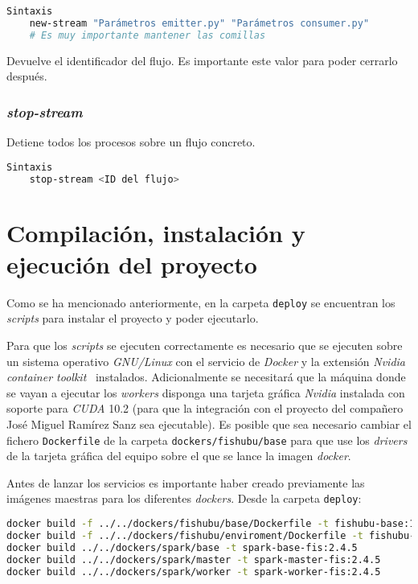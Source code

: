 \begin{lstlisting}[language=Bash]
Sintaxis
	new-stream "Parámetros emitter.py" "Parámetros consumer.py"
	# Es muy importante mantener las comillas
\end{lstlisting}

Devuelve el identificador del flujo. Es importante este valor para poder cerrarlo después.

\subsubsection{\textit{stop-stream}}
Detiene todos los procesos sobre un flujo concreto.

\begin{lstlisting}[language=Bash]
Sintaxis
	stop-stream <ID del flujo>
\end{lstlisting}

\section{Compilación, instalación y ejecución del proyecto}

Como se ha mencionado anteriormente, en la carpeta \texttt{deploy} se encuentran los \textit{scripts} para instalar el proyecto y poder ejecutarlo.

Para que los \textit{scripts} se ejecuten correctamente es necesario que se ejecuten sobre un sistema operativo \textit{GNU/Linux} con el servicio de \textit{Docker} y la extensión \textit{Nvidia container toolkit}~\cite{toolkitnvidiadocker} instalados. Adicionalmente se necesitará que la máquina donde se vayan a ejecutar los \textit{workers} disponga una tarjeta gráfica \textit{Nvidia} instalada con soporte para \textit{CUDA} 10.2 (para que la integración con el proyecto del compañero José Miguel Ramírez Sanz sea ejecutable). Es posible que sea necesario cambiar el fichero \texttt{Dockerfile} de la carpeta \texttt{dockers/fishubu/base} para que use los \textit{drivers} de la tarjeta gráfica del equipo sobre el que se lance la imagen \textit{docker}. 

Antes de lanzar los servicios es importante haber creado previamente las imágenes maestras para los diferentes \textit{dockers}. Desde la carpeta \texttt{deploy}:

\begin{lstlisting}[language=Bash]
docker build -f ../../dockers/fishubu/base/Dockerfile -t fishubu-base:1.0.0 ../../
docker build -f ../../dockers/fishubu/enviroment/Dockerfile -t fishubu-env:1.0.0 ../../
docker build ../../dockers/spark/base -t spark-base-fis:2.4.5
docker build ../../dockers/spark/master -t spark-master-fis:2.4.5
docker build ../../dockers/spark/worker -t spark-worker-fis:2.4.5
\end{lstlisting}

